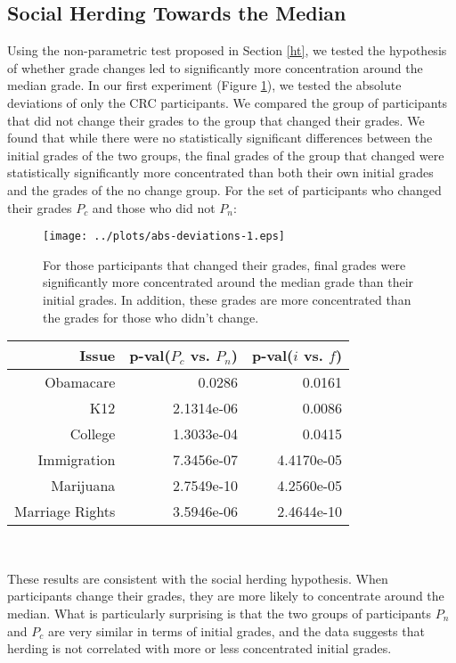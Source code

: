 \subsection{Social Herding Towards the Median}
Using the non-parametric test proposed in Section \ref{ht}, we tested the hypothesis of whether grade changes led to significantly more concentration around the median grade.
In our first experiment (Figure \ref{mdev-1}), we tested the absolute deviations of only the CRC participants.
We compared the group of participants that did not change their grades to the group that changed their grades.
We found that while there were no statistically significant differences between the initial grades of the two groups, the final grades of the group that changed were statistically significantly more concentrated than both their own initial grades and the grades of the no change group.
For the set of participants who changed their grades $P_c$ and those who did not $P_n$:
\begin{figure}[h]
\hspace{-2em}
    \texttt{[image: ../plots/abs-deviations-1.eps]}
      \caption{For those participants that changed their grades, final grades were significantly more concentrated around the median grade than their initial grades. In addition, these grades are more concentrated than the grades for those who didn't change.}
      \label{mdev-1}
\end{figure}

{\centering
\scriptsize
\begin{tabular}[!ht] { r | r | r }
\label{dev-2}
  Issue & p-val($P_c$ vs. $P_n$) & p-val($i$ vs. $f$) \\
  \hline
  \hline
  Obamacare &  0.0286 & 0.0161 \\
  \hline
  K12 & 2.1314e-06 &  0.0086 \\
  \hline
  College & 1.3033e-04 & 0.0415 \\
  \hline
  Immigration & 7.3456e-07 &4.4170e-05\\
  \hline
  Marijuana & 2.7549e-10 & 4.2560e-05\\
  \hline
  Marriage Rights & 3.5946e-06 & 2.4644e-10 \\
\end{tabular}\\[1\baselineskip]
}

These results are consistent with the social herding hypothesis.
When participants change their grades, they are more likely to concentrate around the median.
What is particularly surprising is that the two groups of participants $P_n$ and $P_c$ are very similar in terms of initial grades, and the data suggests that herding is not correlated with more or less concentrated initial grades.

